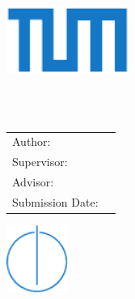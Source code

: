 \begin{titlepage}
  \centering

  \vspace{40mm}
  \includegraphics[width=40mm]{logos/tumBlue}

  \vspace{10mm}
  {\huge\MakeUppercase{\getFaculty{}}}\\

  {\large\MakeUppercase{\getUniversity{}}}\\

  \vspace{20mm}
  {\Large \getDoctype{}}

  \vspace{15mm}
  {\huge\bfseries \getTitle{}}

  \vspace{15mm}
  {\huge\bfseries \getTitleGer{}}

  \vspace{20mm}
  \begin{tabular}{l l}
    Author: & \getAuthor{} \\
    Supervisor: & \getSupervisor{} \\
    Advisor: & \getAdvisor{} \\
    Submission Date: & \getSubmissionDate{} \\
  \end{tabular}

  \vspace{20mm}
  \includegraphics[width=20mm]{logos/facultyBlue}
\end{titlepage}
